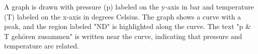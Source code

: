 A graph is drawn with pressure (p) labeled on the y-axis in bar and temperature (T) labeled on the x-axis in degrees Celsius. The graph shows a curve with a peak, and the region labeled "ND" is highlighted along the curve. The text "p & T gehören zusammen" is written near the curve, indicating that pressure and temperature are related.